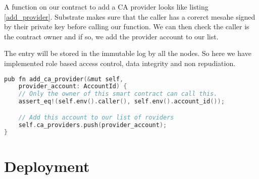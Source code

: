 A function on our contract to add a CA provider looks like listing \ref{add_provider}. 
Substrate makes sure that the caller has a corerct mesahe signed by their private key before calling our function. 
We can then check the caller is the contract owner and if so, we add the provider account to our list.

The entry will be stored in the immutable log by all the nodes. So here we have implemented role based access control, 
data integrity and non repudiation. 


\begin{lstlisting}[label={add_provider},language=c,caption={Add a provider}]
pub fn add_ca_provider(&mut self, 
    provider_account: AccountId) {
    // Only the owner of this smart contract can call this.
    assert_eq!(self.env().caller(), self.env().account_id());

    // Add this account to our list of roviders
    self.ca_providers.push(provider_account);
}
\end{lstlisting}

\section{Deployment}